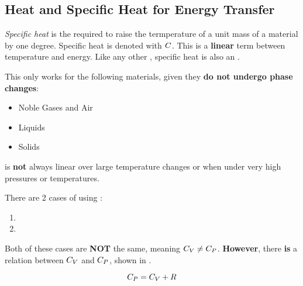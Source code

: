 \subsection{Heat and Specific Heat for Energy Transfer}\label{subsec:Heat_Specific_Heat_Energy_Transfer}
\begin{definition}\label{def:Specific_Heat}
  \emph{Specific heat} is the  required to raise the termperature of a unit mass of a material by one degree.
  Specific heat is denoted with $C$.
  This is a \textbf{linear} term between temperature and energy.
  Like any other , specific heat is also an .

  \begin{remark}
    This  only works for the following materials, given they \textbf{do not undergo phase changes}:
    \begin{itemize}[noitemsep]
    \item Noble Gases and Air
    \item Liquids
    \item Solids
    \end{itemize}
  \end{remark}

  \begin{remark}
     is \textbf{not} always linear over large temperature changes or when under very high pressures or temperatures.
  \end{remark}
\end{definition}

There are 2 cases of using :
\begin{enumerate}[noitemsep]
\item {}
\item {}
\end{enumerate}

Both of these cases are \textbf{NOT} the same, meaning $C_{V} \neq C_{P}$.
{\large\textbf{However}}, there \textbf{is} a relation between $C_{V}$ and $C_{P}$, shown in .

\begin{equation}\label{eq:Specific_Heat_Constant_Volume_Constant_Pressure_Relation}
  C_{P} = C_{V} + R
\end{equation}


